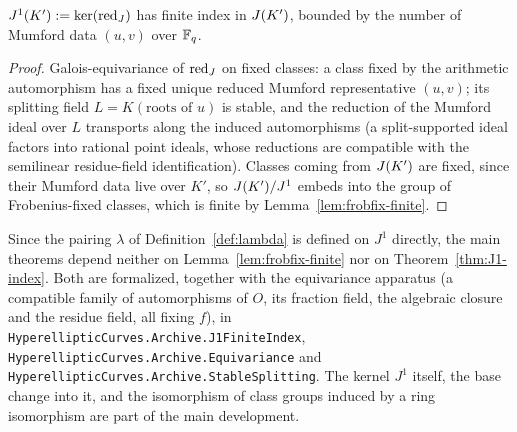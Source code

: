 \begin{theorem}
\label{thm:J1-index}
\leanok
{}
$J^1(K') := \ker(\operatorname{red}_J)$ has finite index in $J(K')$, bounded by the number of Mumford
data $(u,v)$ over $\mathbb{F}_q$.
\end{theorem}
\begin{proof}
\leanok
Galois-equivariance of $\operatorname{red}_J$ on fixed classes: a class fixed by the arithmetic
automorphism has a fixed unique reduced Mumford representative $(u,v)$; its splitting
field $L = K(\text{roots of }u)$ is stable, and the reduction of the Mumford ideal over
$L$ transports along the induced automorphisms (a split-supported ideal factors into
rational point ideals, whose reductions are compatible with the semilinear
residue-field identification). Classes coming from $J(K')$ are fixed, since their
Mumford data live over $K'$, so $J(K')/J^1$ embeds into the group of Frobenius-fixed
classes, which is finite by Lemma~\ref{lem:frobfix-finite}.
\end{proof}

\begin{remark}[Formalization]
Since the pairing $\lambda$ of Definition~\ref{def:lambda} is defined on $J^1$
directly, the main theorems depend neither on Lemma~\ref{lem:frobfix-finite} nor on
Theorem~\ref{thm:J1-index}. Both are formalized, together with the equivariance apparatus
(a compatible family of automorphisms of $O$, its fraction field, the algebraic closure
and the residue field, all fixing $f$), in
\texttt{HyperellipticCurves.Archive.J1FiniteIndex},
\texttt{HyperellipticCurves.Archive.Equivariance} and
\texttt{HyperellipticCurves.Archive.StableSplitting}. The kernel $J^1$ itself, the base
change into it, and the isomorphism of class groups induced by a ring isomorphism are part
of the main development.
\end{remark}
